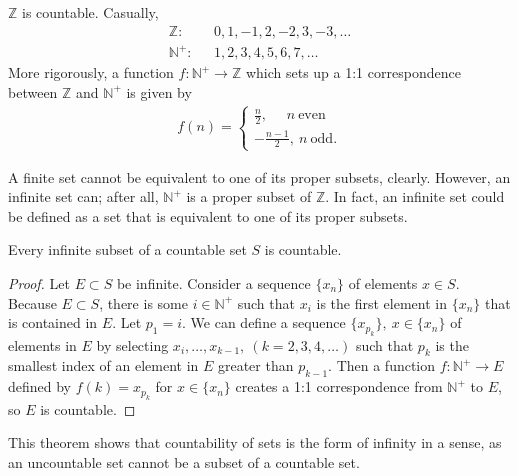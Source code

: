 \documentclass[12pt]{article}
\begin{document}
\begin{exm}
  $\mathbb{Z}$ is countable. Casually,
  \begin{align*}
    \mathbb{Z}:&\ \ \ 0,1,-1,2,-2,3,-3,\ldots\\
    \mathbb{N}^+:&\ \ \ 1,2,3,4,5,6,7,\ldots
  \end{align*}
  More rigorously, a function $f: \mathbb{N}^+ \to \mathbb{Z}$ which sets up a 1:1
  correspondence between $\mathbb{Z}$ and $\mathbb{N}^+$ is given by
  \begin{align*}
    f(n) =
    \begin{cases}
      \frac{n}{2},\ \ \ \ \ \ n\ \text{even}\\
      -\frac{n-1}{2},\ n\ \text{odd}.
    \end{cases}
  \end{align*}
\end{exm}

\begin{comm}
  A finite set cannot be equivalent to one of its proper subsets, clearly. However,
  an infinite set can; after all, $\mathbb{N}^+$ is a proper subset of $\mathbb{Z}$.
  In fact, an infinite set could be defined as a set that is equivalent to one of its
  proper subsets.
\end{comm}

\begin{thm}
  Every infinite subset of a countable set $S$ is countable.

  \begin{proof}
    Let $E \subset S$ be infinite. Consider a sequence $\{x_n\}$ of elements $x \in
    S$. Because $E \subset S$, there is some $i \in \mathbb{N}^+$ such that $x_i$ is
    the first element in $\{x_n\}$ that is contained in $E$. Let $p_1 = i$. We can define a sequence
    $\{x_{p_k}\},\ x \in \{x_n\}$ of elements in $E$ by selecting $x_i,\ldots,x_{k-1},\
    (k = 2,3,4,\ldots)$ such that $p_k$ is the smallest index of an element in $E$
    greater than $p_{k-1}$. Then a function $f: \mathbb{N}^+ \to E$ defined by $f(k)
    = x_{p_k}$ for $x \in \{x_n\}$ creates a 1:1 correspondence from $\mathbb{N}^+$
    to $E$, so $E$ is countable.
  \end{proof}
\end{thm}

\begin{comm}
  This theorem shows that countability of sets is the  form of infinity
  in a sense, as an uncountable set cannot be a subset of a countable set.
\end{comm}
\end{document}
